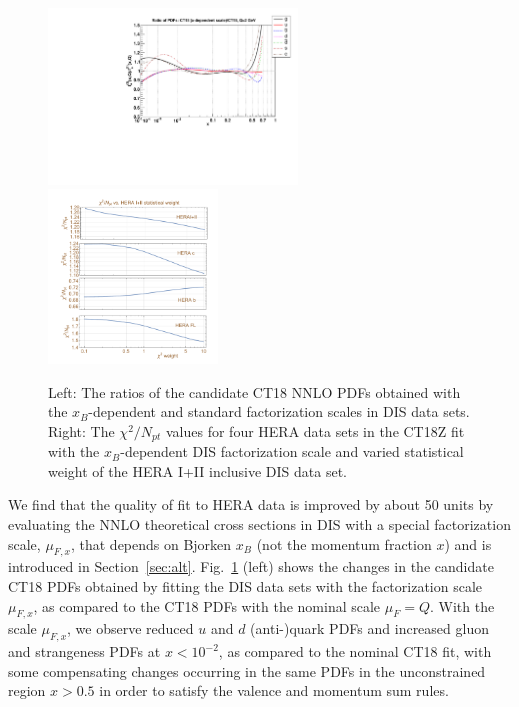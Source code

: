 \begin{figure}[tb]
	\includegraphics[width=0.59\textwidth]{./fig/ct18saturationToct18.pdf}
	\includegraphics[width=0.4\textwidth]{./fig/HERAchi2NptWT_scan2Tct18z.pdf}
\caption{Left: The ratios of the candidate CT18 NNLO PDFs obtained with the
  $x_B$-dependent and standard factorization scales in DIS data
  sets. Right: The $\chi^2/N_{pt}$ values for four HERA data sets in
  the CT18Z fit with the $x_B$-dependent DIS factorization scale and
  varied statistical weight of the HERA I+II inclusive DIS data set.}
\label{fig:saturation}
\end{figure}


%
%
We find that the quality of fit to HERA data is improved by about 50 units by evaluating the NNLO theoretical cross sections in DIS with a special factorization scale, $\mu_{F,x}$, that depends on Bjorken $x_B$ (not the momentum fraction $x$) and is introduced in Section~\ref{sec:alt}. Fig.~\ref{fig:saturation} (left) shows
the changes in the candidate CT18 PDFs obtained by fitting the DIS data sets with the factorization scale $\mu_{F,x}$, as compared to the CT18 PDFs
with the nominal scale $\mu_F=Q$. With the scale $\mu_{F,x}$, we observe
reduced $u$ and $d$ (anti-)quark PDFs and increased gluon and
strangeness PDFs at $x < 10^{-2}$, as compared to the nominal CT18 fit,
with some compensating changes occurring in the same PDFs in the
unconstrained region $x > 0.5$ in order to satisfy the valence and
momentum sum rules. 

